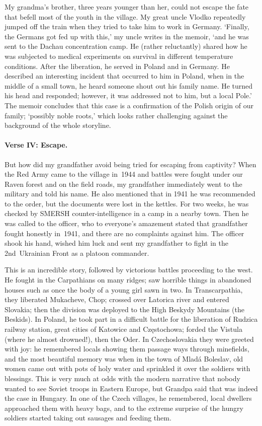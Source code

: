 My grandma's brother, three years younger than her, could not escape
the fate that befell most of the youth in the village. My great uncle
Vlodko repeatedly jumped off the train when they tried to take him to
work in Germany. `Finally, the Germans got fed up with this,' my
uncle writes in the memoir, `and he was sent to the Dachau
concentration camp. He (rather reluctantly) shared how he was
subjected to medical experiments on survival in different temperature
conditions. After the liberation, he served in Poland and in
Germany. He described an interesting incident that occurred to him in
Poland, when in the middle of a small town, he heard someone shout out
his family name. He turned his head and responded; however, it was
addressed not to him, but a local Pole.' The memoir concludes that
this case is a confirmation of the Polish origin of our family;
`possibly noble roots,' which looks rather challenging against the
background of the whole storyline.

\paragraph{Verse IV: Escape.}\strut

But how did my grandfather avoid being tried for escaping from
captivity?  When the Red Army came to the village in~1944 and battles
were fought under our Raven forest and on the field roads, my
grandfather immediately went to the military and told his name. He
also mentioned that in 1941 he was recommended to the order, but the
documents were lost in the kettles. %
For two weeks, he was checked
by SMERSH counter-intelligence in a camp in a nearby town. Then he was
called to the officer, who to everyone's amazement stated that
grandfather fought honestly in~1941, and there are no complaints
against him. The officer shook his hand, wished him luck and sent my
grandfather to fight in the 2nd~Ukrainian Front as a platoon
commander.

This is an incredible story, followed by victorious battles proceeding
to the west. He fought in the Carpathians on many ridges; saw horrible
things in abandoned houses such as once the body of a young girl sawn
in two. In Transcarpathia, they liberated Mukacheve, Chop; crossed
over Latorica river and entered Slovakia; then the division was
deployed to the High Beskydy Mountains (the Beskids). In Poland, he
took part in a difficult battle for the liberation of Rudzica railway
station, great cities of Katowice and Częstochowa; forded the Vistula %
(where he almost drowned!), then the Oder. In Czechoslovakia they were
greeted with joy: he remembered locals showing them passage ways through %
minefields, and the most beautiful memory was when in the town of
Mladá Boleslav, old women came out with pots of holy water and
sprinkled it over the soldiers with blessings. This is very much at
odds with the modern narrative that nobody wanted to see Soviet troops
in Eastern Europe, but Grandpa said that was indeed the case in
Hungary. In one of the Czech villages, he remembered, local dwellers
approached them with heavy bags, and to the extreme surprise of the hungry
soldiers started taking out sausages and feeding them.

